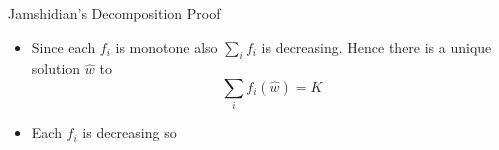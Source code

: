 \documentclass{beamer}
\begin{document}
\begin{frame}{Jamshidian's Decomposition Proof}
\begin{itemize}
	\item<1-> Since each $f_i$ is monotone also $\sum_i f_i$ is decreasing. Hence there is a unique solution $\hat{w}$ to 
	\begin{equation*}
		\sum_i f_i(\hat{w}) = K   
	\end{equation*}
	\item<2-> Each $f_i$ is decreasing so
	\begin{columns}
\end{columns}
\end{itemize}
\end{frame}
\end{document}
